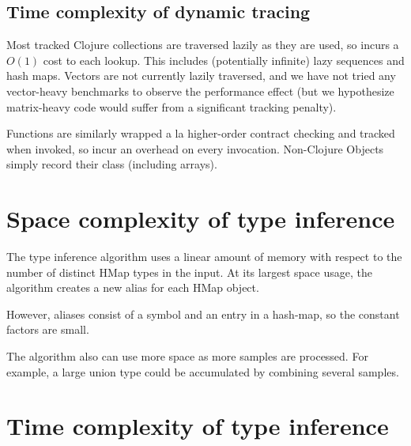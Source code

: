 %

\subsection{Time complexity of dynamic tracing}

Most tracked Clojure collections are traversed lazily as they are used,
so incurs a $O(1)$ cost to each lookup.
This includes (potentially infinite) lazy sequences and hash maps.
Vectors are not currently lazily traversed, and we have not tried any vector-heavy
benchmarks to observe the performance effect (but we hypothesize matrix-heavy
code would suffer from a significant tracking penalty).

Functions are similarly wrapped a la higher-order contract checking and tracked when invoked,
so incur an overhead on every invocation.
Non-Clojure Objects simply record their class (including arrays).

\pagebreak

\section{Space complexity of type inference}

The type inference algorithm uses a linear amount of memory with respect
to the number of distinct HMap types in the input.
At its largest space usage, the algorithm creates a new alias for each HMap object.

However, aliases consist of a symbol and an entry in a hash-map, so the constant
factors are small.

The algorithm also can use more space as more samples are processed. For example,
a large union type could be accumulated by combining several samples.

\section{Time complexity of type inference}

